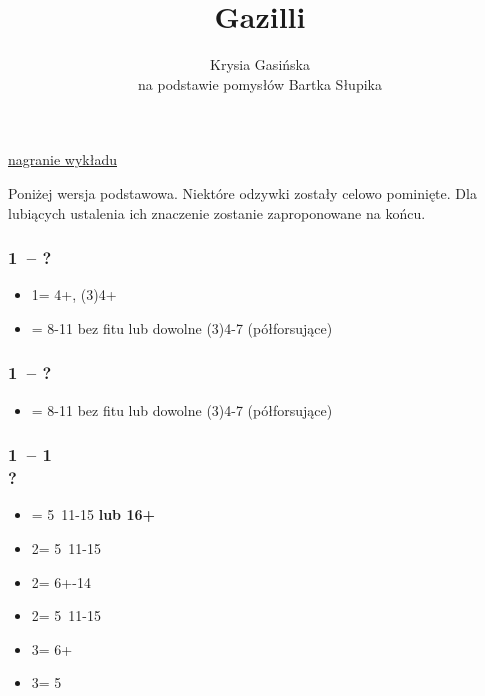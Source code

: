 \documentclass[12pt, a4paper]{article}
\title{\fontsize{30pt}{30pt}\selectfont Gazilli}
\author{Krysia Gasińska\\
        \small{na podstawie pomysłów Bartka Słupika}}
\begin{document}
\maketitle

\begin{formal}
\href{https://www.youtube.com/watch?v=jFrwjz1Wa-8&list=PL0M097usj0YaTfcHFybtHepIQikiOLg9i&index=8}{nagranie wykładu} 
\vspace{0.3cm}
\end{formal}

Poniżej wersja podstawowa. Niektóre odzywki zostały celowo pominięte. Dla lubiących ustalenia ich znaczenie
zostanie zaproponowane na końcu.

\subsubsection*{1\hearts\ -- ?}
\begin{itemize}
    \item 1\spades = 4+\spades, (3)4+ \hcp
    \item \alrts{1\ntx} = 8-11 bez fitu lub dowolne (3)4-7 (półforsujące)
\end{itemize}

\subsubsection*{1\spades\ -- ?}
\begin{itemize}
    \item \alrts{1\ntx} = 8-11 bez fitu lub dowolne (3)4-7 (półforsujące)
\end{itemize}

\subsubsection*{1\hearts\ -- 1\spades\ \\ ?}
\begin{itemize}
    \item \alrts{2\clubs} = 5\clubs\ 11-15 \textbf{lub 16+} \fonce \imp
    \item 2\diams = 5\diams\ 11-15
    \item 2\hearts = 6+-14
    \item 2\spades = 5\spades\ 11-15
    \item 3\hearts = 6+\hearts\ \inv
    \item 3\spades = 5\spades\ \inv
\end{itemize}
\end{document}
